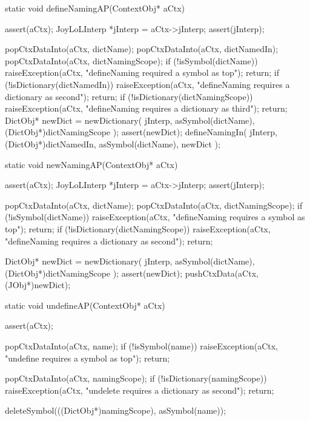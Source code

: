 \startCCode
static void defineNamingAP(ContextObj* aCtx) {
  assert(aCtx);
  JoyLoLInterp *jInterp = aCtx->jInterp;
  assert(jInterp);
  
  popCtxDataInto(aCtx, dictName);
  popCtxDataInto(aCtx, dictNamedIn);
  popCtxDataInto(aCtx, dictNamingScope);
  if (!isSymbol(dictName)) {
    raiseException(aCtx,
      "defineNaming required a symbol as top");
    return;
  }
  if (!isDictionary(dictNamedIn)) {
    raiseException(aCtx,
      "defineNaming requires a dictionary as second");
    return;
  }
  if (!isDictionary(dictNamingScope)) {
    raiseException(aCtx,
      "defineNaming requires a dictionary as third");
    return;
  }
  DictObj* newDict =
    newDictionary(
      jInterp,
      asSymbol(dictName),
      (DictObj*)dictNamingScope
    );
  assert(newDict);
  defineNamingIn(
    jInterp,
    (DictObj*)dictNamedIn,
    asSymbol(dictName),
    newDict
  );
}
\stopCCode

\startCCode
static void newNamingAP(ContextObj* aCtx) {
  assert(aCtx);
  JoyLoLInterp *jInterp = aCtx->jInterp;
  assert(jInterp);

  popCtxDataInto(aCtx, dictName);
  popCtxDataInto(aCtx, dictNamingScope);
  if (!isSymbol(dictName)) {
    raiseException(aCtx,
      "defineNaming requires a symbol as top");
    return;
  }
  if (!isDictionary(dictNamingScope)) {
    raiseException(aCtx,
      "defineNaming requires a dictionary as second");
    return;
  }

  DictObj* newDict =
    newDictionary(
      jInterp,
      asSymbol(dictName),
      (DictObj*)dictNamingScope
    );
  assert(newDict);
  pushCtxData(aCtx, (JObj*)newDict);
}
\stopCCode

\startCCode
static void undefineAP(ContextObj* aCtx) {
  assert(aCtx);
  
  popCtxDataInto(aCtx, name);
  if (!isSymbol(name)) {
    raiseException(aCtx,
      "undefine requires a symbol as top");
    return;
  }
  
  popCtxDataInto(aCtx, namingScope);
  if (!isDictionary(namingScope)) {
    raiseException(aCtx,
      "undelete requires a dictionary as second");
    return;
  }
  
  deleteSymbol(((DictObj*)namingScope), asSymbol(name));
  }
\stopCCode

